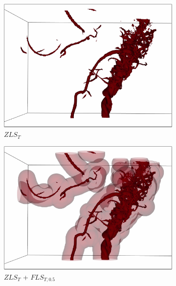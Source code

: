 \begin{figure}[h]
\begin{subfigure}{0.26\linewidth}
\centering
\includegraphics[width=\linewidth]{Images/Tornado/zls.pdf}
\caption{$ZLS_{T}$}
\label{}
\end{subfigure}
\begin{subfigure}{0.26\linewidth}
\centering
\includegraphics[width=\linewidth]{Images/Tornado/fls_05.pdf}
\caption{$ZLS_{T}$ + $FLS_{T,0.5}$}
\label{}
\end{subfigure}
\begin{subfigure}{0.26\linewidth}
\centering

\end{subfigure}
\end{figure}

